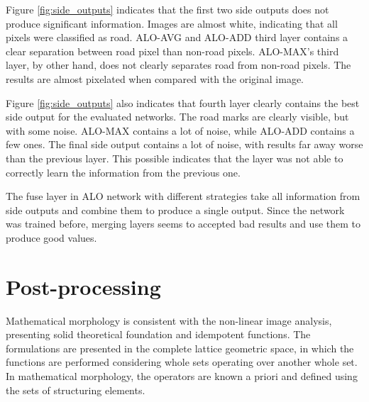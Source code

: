 Figure \ref{fig:side_outputs} indicates that the first two side outputs does not produce significant information. Images are almost white, indicating that all pixels were classified as road. ALO-AVG and ALO-ADD third layer contains a clear separation between road pixel than non-road pixels. ALO-MAX's third layer, by other hand, does not clearly separates road from non-road pixels. The results are almost pixelated when compared with the original image.

Figure \ref{fig:side_outputs} also indicates that fourth layer clearly contains the best side output for the evaluated networks. The road marks are clearly visible, but with some noise. ALO-MAX contains a lot of noise, while ALO-ADD contains a few ones. The final side output contains a lot of noise, with results far away worse than the previous layer. This possible indicates that the layer was not able to correctly learn the information from the previous one.

The fuse layer in ALO network with different strategies take all information from side outputs and combine them to produce a single output. Since the network was trained before, merging layers seems to accepted bad results and use them to produce good values.

%

\section{Post-processing}


Mathematical morphology is consistent with the non-linear image analysis, presenting solid theoretical foundation and idempotent functions. The formulations are presented in the complete lattice geometric space, in which the functions are performed considering whole sets operating over another whole set. In mathematical morphology, the operators are known a priori and defined using the sets of structuring elements.

